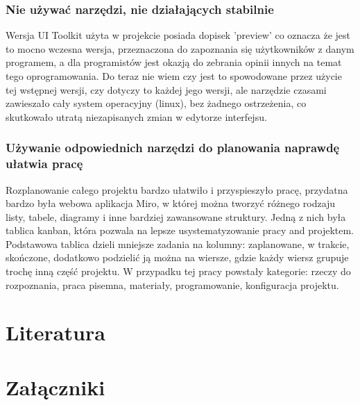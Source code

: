 \documentclass{article} %
\begin{document}
    \subsubsection*{Nie używać narzędzi, nie działających stabilnie}
        Wersja UI Toolkit użyta w projekcie posiada dopisek 'preview' co oznacza że jest to mocno wczesna wersja, przeznaczona do zapoznania się użytkowników z danym programem, a dla programistów jest okazją do zebrania opinii innych na temat tego oprogramowania. Do teraz nie wiem czy jest to spowodowane przez użycie tej wstępnej wersji, czy dotyczy to każdej jego wersji, ale narzędzie czasami zawieszało cały system operacyjny (linux), bez żadnego ostrzeżenia, co skutkowało utratą niezapisanych zmian w edytorze interfejsu.
        \\
    
    \subsubsection*{Używanie odpowiednich narzędzi do planowania naprawdę ułatwia pracę}
        Rozplanowanie całego projektu bardzo ułatwiło i przyspieszyło pracę, przydatna bardzo była webowa aplikacja Miro, w której można tworzyć różnego rodzaju listy, tabele, diagramy i inne bardziej zawansowane struktury. Jedną z nich była tablica kanban, która pozwala na lepsze usystematyzowanie pracy and projektem. Podstawowa tablica dzieli mniejsze zadania na kolumny: zaplanowane, w trakcie, skończone, dodatkowo podzielić ją można na wiersze, gdzie każdy wiersz grupuje trochę inną część projektu. W przypadku tej pracy powstały kategorie: rzeczy do rozpoznania, praca pisemna, materiały, programowanie, konfiguracja projektu. 
        \\


\newpage
\section{Literatura}

\newpage
\section{Załączniki}
\end{document}
